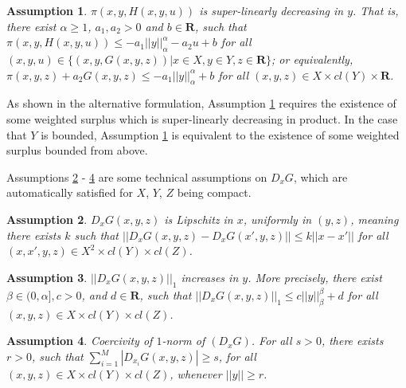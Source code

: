 \documentclass[a4paper, 11pt]{amsart}
\numberwithin{equation}{section}
\theoremstyle{plain}
\newtheorem{assumption}{Assumption}
\theoremstyle{definition}
\theoremstyle{remark}
\newcommand{\R}{\mathbf{R}}
\begin{document}
	\begin{assumption}\label{assmp:Gtech0}
		$\pi(x,y,H(x,y,u))$ is super-linearly decreasing in $y$. That is, there exist $\alpha \ge 1$, $a_1, a_2> 0$ and $b\in \R$, such that $\pi(x,y,H(x,y,u)) \le -a_1 ||y||_{\alpha}^{\alpha} - a_2 u +b$ for all $ (x, y, u)\in \{ (x,y, G(x,y,z))| x\in X, y\in Y, z\in \R \}$; or equivalently, $\pi(x,y,z) + a_2 G(x,y,z) \le -a_1 ||y||_{\alpha}^{\alpha}  +b$ for all $ (x, y, z)\in X\times cl(Y)\times \R$.
	\end{assumption}
	
	
	As shown in the alternative formulation, Assumption \ref{assmp:Gtech0} requires the existence of some weighted surplus which is super-linearly decreasing in product. In the case that $Y$ is bounded, Assumption \ref{assmp:Gtech0} is equivalent to the existence of some weighted surplus bounded from above.   \medskip






Assumptions \ref{assmp:Gtech1} - \ref{assmp:Gtech3} are some technical assumptions on $D_xG$, which are automatically satisfied for $X$, $Y$, $Z$ being compact.\medskip


\begin{assumption}\label{assmp:Gtech1}
	{$D_x G(x,y,z)$ is Lipschitz in $x$},
	uniformly in $(y,z)$, meaning there exists $k$ such that
	$||D_xG(x,y,z)-D_x G(x',y,z)||\le k||x-x'||$ %
	for all $(x, x',y, z)\in X^2\times cl(Y) \times cl(Z)$.
\end{assumption}


\begin{assumption}\label{assmp:Gtech2}
	 $||D_x G(x,y,z)||_{1}$ increases in $y$. More precisely, there exist $ \beta \in (0, \alpha], c>0$, and $ d\in \R$, such that $||D_x G(x,y,z)||_{1}\le c||y||_{\beta}^{\beta} +d$ for all $ (x, y, z)\in X\times cl(Y) \times cl(Z)$.
\end{assumption}


\begin{assumption}\label{assmp:Gtech3}
	 Coercivity of {$1$-norm} of $(D_xG)$. For all $ s>0$, there exists $r>0$, such that $\sum_{i=1}^{M} |D_{x_i}G(x,y,z)|\ge s$, for all $(x, y, z)\in X\times  cl(Y) \times cl(Z)$, whenever $||y||\ge r$.
\end{assumption}
\end{document}
